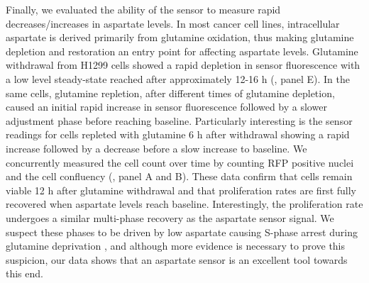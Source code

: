 \documentclass[9pt,lineno]{elife}
\begin{document}
Finally, we evaluated the ability of the sensor to measure rapid decreases/increases in aspartate levels.
In most cancer cell lines, intracellular aspartate is derived primarily from glutamine oxidation, thus making glutamine depletion and restoration an entry point for affecting aspartate levels.
Glutamine withdrawal from H1299 cells showed a rapid depletion in sensor fluorescence with a low level steady-state reached after approximately 12-16 h (, panel E).
In the same cells, glutamine repletion, after different times of glutamine depletion, caused an initial rapid increase in sensor fluorescence followed by a slower adjustment phase before reaching baseline.
Particularly interesting is the sensor readings for cells repleted with glutamine 6 h after withdrawal showing a rapid increase followed by a decrease before a slow increase to baseline.
We concurrently measured the cell count over time by counting RFP positive nuclei and the cell confluency (, panel A and B).
These data confirm that cells remain viable 12 h after glutamine withdrawal and that proliferation rates are first fully recovered when aspartate levels reach baseline.
Interestingly, the proliferation rate undergoes a similar multi-phase recovery as the aspartate sensor signal.
We suspect these phases to be driven by low aspartate causing S-phase arrest during glutamine deprivation \citep{Patel2016-ms}, and although more evidence is necessary to prove this suspicion, our data shows that an aspartate sensor is an excellent tool towards this end.
\end{document}
